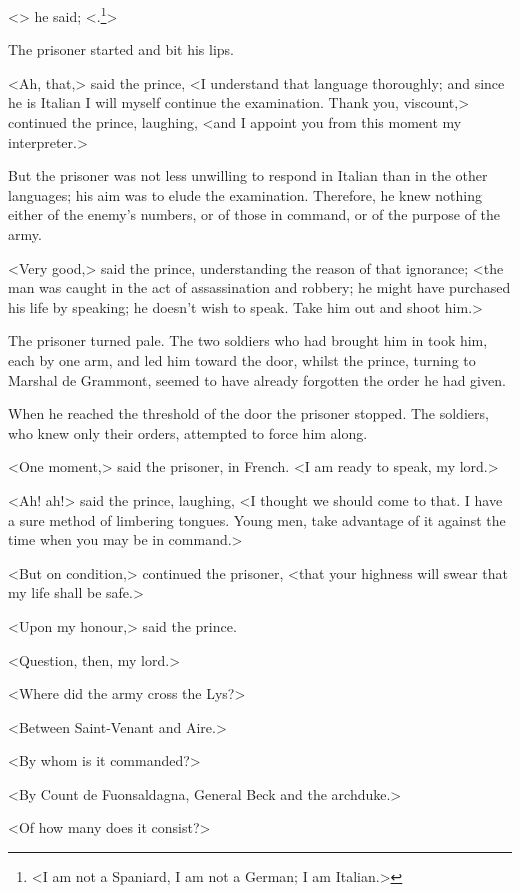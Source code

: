 <> he said; <.\footnote{<I am not a Spaniard, I am not a German; I am Italian.>}>

The prisoner started and bit his lips.

<Ah, that,> said the prince, <I understand that language thoroughly; and since he is Italian I will myself continue the examination. Thank you, viscount,> continued the prince, laughing, <and I appoint you from this moment my interpreter.>

But the prisoner was not less unwilling to respond in Italian than in the other languages; his aim was to elude the examination. Therefore, he knew nothing either of the enemy's numbers, or of those in command, or of the purpose of the army.

<Very good,> said the prince, understanding the reason of that ignorance; <the man was caught in the act of assassination and robbery; he might have purchased his life by speaking; he doesn't wish to speak. Take him out and shoot him.>

The prisoner turned pale. The two soldiers who had brought him in took him, each by one arm, and led him toward the door, whilst the prince, turning to Marshal de Grammont, seemed to have already forgotten the order he had given.

When he reached the threshold of the door the prisoner stopped. The soldiers, who knew only their orders, attempted to force him along.

<One moment,> said the prisoner, in French. <I am ready to speak, my lord.>

<Ah! ah!> said the prince, laughing, <I thought we should come to that. I have a sure method of limbering tongues. Young men, take advantage of it against the time when you may be in command.>

<But on condition,> continued the prisoner, <that your highness will swear that my life shall be safe.>

<Upon my honour,> said the prince.

<Question, then, my lord.>

<Where did the army cross the Lys?>

<Between Saint-Venant and Aire.>

<By whom is it commanded?>

<By Count de Fuonsaldagna, General Beck and the archduke.>

<Of how many does it consist?>

